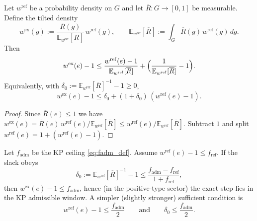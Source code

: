 \begin{proposition}\label{prop:tilt_budget_identity}
Let $w^{\mathrm{ref}}$ be a probability density on $G$ and let $\overline R:G\to[0,1]$ be measurable.
Define the tilted density
\[
w^{\mathrm{ex}}(g):=\frac{\overline R(g)}{\mathbb E_{w^{\mathrm{ref}}}[\overline R]}\,w^{\mathrm{ref}}(g),
\qquad
\mathbb E_{w^{\mathrm{ref}}}[\overline R]:=\int_G \overline R(g)\,w^{\mathrm{ref}}(g)\,dg.
\]
Then
\begin{equation}\label{eq:tilt_budget_identity}
w^{\mathrm{ex}}(e)-1
\le
\frac{w^{\mathrm{ref}}(e)-1}{\mathbb E_{w^{\mathrm{ref}}}[\overline R]}
+\Bigl(\frac{1}{\mathbb E_{w^{\mathrm{ref}}}[\overline R]}-1\Bigr).
\end{equation}
Equivalently, with $\delta_0:=\mathbb E_{w^{\mathrm{ref}}}[\overline R]^{-1}-1\ge 0$,
\begin{equation}\label{eq:tilt_budget_identity_delta}
w^{\mathrm{ex}}(e)-1 \le \delta_0 + (1+\delta_0)\,(w^{\mathrm{ref}}(e)-1).
\end{equation}
\end{proposition}

\begin{proof}
Since $\overline R(e)\le 1$ we have
$w^{\mathrm{ex}}(e)=\overline R(e)\,w^{\mathrm{ref}}(e)/\mathbb E_{w^{\mathrm{ref}}}[\overline R]\le w^{\mathrm{ref}}(e)/\mathbb E_{w^{\mathrm{ref}}}[\overline R]$.
Subtract $1$ and split $w^{\mathrm{ref}}(e)=1+(w^{\mathrm{ref}}(e)-1)$.
\end{proof}

\begin{corollary}\label{cor:tilt_budget_KP}
Let $f_{\mathrm{adm}}$ be the KP ceiling \eqref{eq:fadm_def}.
Assume $w^{\mathrm{ref}}(e)-1\le f_{\mathrm{ref}}$.
If the slack obeys
\begin{equation}\label{eq:slack_budget_condition}
\delta_0:=\mathbb E_{w^{\mathrm{ref}}}[\overline R]^{-1}-1
\le \frac{f_{\mathrm{adm}}-f_{\mathrm{ref}}}{1+f_{\mathrm{ref}}},
\end{equation}
then $w^{\mathrm{ex}}(e)-1\le f_{\mathrm{adm}}$, hence (in the positive-type sector) the exact step lies in the KP admissible window.
A simpler (slightly stronger) sufficient condition is
\[
w^{\mathrm{ref}}(e)-1\le \frac{f_{\mathrm{adm}}}{2}
\qquad\text{and}\qquad
\delta_0\le \frac{f_{\mathrm{adm}}}{2}.
\]
\end{corollary}

